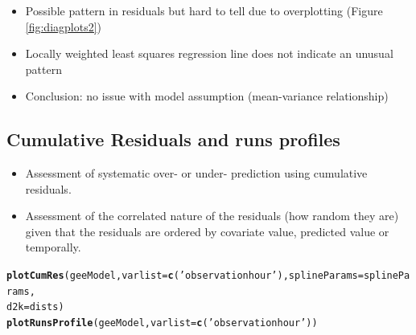 \documentclass[11pt, a4paper]{article}
\makeatletter
\newcommand{\hlfunctioncall}[1]{\textcolor[rgb]{0.501960784313725,0,0.329411764705882}{\textbf{#1}}}%
\newcommand{\hlstring}[1]{\textcolor[rgb]{0.6,0.6,1}{#1}}%
\newenvironment{kframe}{%
 \def\at@end@of@kframe{}%
 \ifinner\ifhmode%
  \def\at@end@of@kframe{\end{minipage}}%
  \begin{minipage}{\columnwidth}%
 \fi\fi%
 \def\FrameCommand##1{\hskip\@totalleftmargin \hskip-\fboxsep
 \colorbox{shadecolor}{##1}\hskip-\fboxsep
     \hskip-\linewidth \hskip-\@totalleftmargin \hskip\columnwidth}%
 \MakeFramed {\advance\hsize-\width
   \@totalleftmargin\z@ \linewidth\hsize
   \@setminipage}}%
 {\par\unskip\endMakeFramed%
 \at@end@of@kframe}
\newenvironment{knitrout}{}{} %
\makeatother
\begin{document}
\begin{frame}
\frametitle{}
\begin{itemize}
\item Possible pattern in residuals but hard to tell due to overplotting (Figure \ref{fig:diagplots2})
\item Locally weighted least squares regression line does not indicate an unusual pattern
\pause
\bigskip
\item Conclusion: no issue with model assumption (mean-variance relationship)
\end{itemize}
\end{frame}

\subsection{Cumulative Residuals and runs profiles}

\begin{frame}[fragile]
\begin{itemize}
\item Assessment of systematic over- or under- prediction using cumulative residuals.
\item Assessment of the correlated nature of the residuals (how random they are) given that the residuals are ordered by covariate value, predicted value or temporally.
\end{itemize}

\begin{knitrout}\footnotesize
{}\color{fgcolor}\begin{kframe}
\begin{alltt}
\hlfunctioncall{plotCumRes}(geeModel, varlist=\hlfunctioncall{c}(\hlstring{'observationhour'}), splineParams=splineParams, 
    d2k=dists)
\hlfunctioncall{plotRunsProfile}(geeModel, varlist=\hlfunctioncall{c}(\hlstring{'observationhour'}))
\end{alltt}
\end{kframe}
\end{knitrout}

\end{frame}
\end{document}
